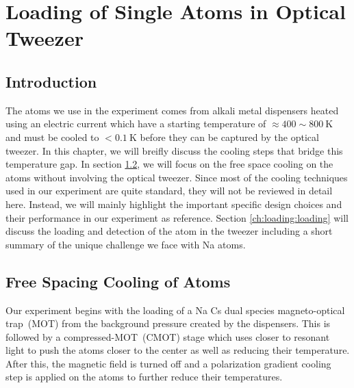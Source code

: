 
\chapter{Loading of Single Atoms in Optical Tweezer}
\label{ch:loading}

\section{Introduction}
\label{ch:loading:introduction}

The atoms we use in the experiment comes from alkali metal dispensers
heated using an electric current which have a starting temperature of
$\approx400\sim800~\mathrm{K}$ and must be cooled to $<0.1~\mathrm{K}$
before they can be captured by the optical tweezer.
In this chapter, we will breifly discuss the cooling steps that bridge this temperature gap.
In section \ref{ch:loading:free-space}, we will focus on the free space cooling
on the atoms without involving the optical tweezer.
Since most of the cooling techniques used in our experiment are quite standard,
they will not be reviewed in detail here.
Instead, we will mainly highlight the important specific design choices
and their performance in our experiment as reference.
Section \ref{ch:loading:loading} will discuss the loading and detection
of the atom in the tweezer including a short summary of the unique challenge
we face with Na atoms.

\section{Free Spacing Cooling of Atoms}
\label{ch:loading:free-space}

Our experiment begins with the loading of a Na Cs dual species magneto-optical trap~(MOT)
from the background pressure created by the dispensers.
This is followed by a compressed-MOT~(CMOT) stage
which uses closer to resonant light to push the atoms closer to the center
as well as reducing their temperature.
After this, the magnetic field is turned off and
a polarization gradient cooling step is applied on the atoms
to further reduce their temperatures.


